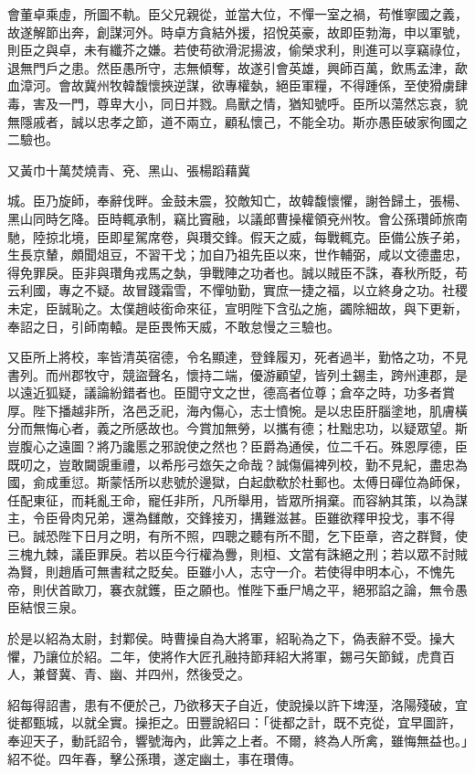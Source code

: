 \begin{pinyinscope}
會董卓乘虛，所圖不軌。臣父兄親從，並當大位，不憚一室之禍，苟惟寧國之義，故遂解節出奔，創謀河外。時卓方貪結外援，招悅英豪，故即臣勃海，申以軍號，則臣之與卓，未有纖芥之嫌。若使苟欲滑泥揚波，偷榮求利，則進可以享竊祿位，退無門戶之患。然臣愚所守，志無傾奪，故遂引會英雄，興師百萬，飲馬孟津，歃血漳河。會故冀州牧韓馥懷挾逆謀，欲專權埶，絕臣軍糧，不得踵係，至使猾虜肆毒，害及一門，尊卑大小，同日并戮。鳥獸之情，猶知號呼。臣所以蕩然忘哀，貌無隱戚者，誠以忠孝之節，道不兩立，顧私懷己，不能全功。斯亦愚臣破家徇國之二驗也。

又黃巾十萬焚燒青、兗、黑山、張楊蹈藉冀

城。臣乃旋師，奉辭伐畔。金鼓未震，狡敵知亡，故韓馥懷懼，謝咎歸土，張楊、黑山同時乞降。臣時輒承制，竊比竇融，以議郎曹操權領兗州牧。會公孫瓚師旅南馳，陸掠北境，臣即星駕席卷，與瓚交鋒。假天之威，每戰輒克。臣備公族子弟，生長京輦，頗聞俎豆，不習干戈；加自乃祖先臣以來，世作輔弼，咸以文德盡忠，得免罪戾。臣非與瓚角戎馬之埶，爭戰陣之功者也。誠以賊臣不誅，春秋所貶，苟云利國，專之不疑。故冒踐霜雪，不憚劬勤，實庶一捷之福，以立終身之功。社稷未定，臣誠恥之。太僕趙岐銜命來征，宣明陛下含弘之施，蠲除細故，與下更新，奉詔之日，引師南轅。是臣畏怖天威，不敢怠慢之三驗也。

又臣所上將校，率皆清英宿德，令名顯達，登鋒履刃，死者過半，勤恪之功，不見書列。而州郡牧守，競盜聲名，懷持二端，優游顧望，皆列土錫圭，跨州連郡，是以遠近狐疑，議論紛錯者也。臣聞守文之世，德高者位尊；倉卒之時，功多者賞厚。陛下播越非所，洛邑乏祀，海內傷心，志士憤惋。是以忠臣肝腦塗地，肌膚橫分而無悔心者，義之所感故也。今賞加無勞，以攜有德；杜黜忠功，以疑眾望。斯豈腹心之遠圖？將乃讒慝之邪說使之然也？臣爵為通侯，位二千石。殊恩厚德，臣既叨之，豈敢闚覬重禮，以希彤弓玈矢之命哉？誠傷偏裨列校，勤不見紀，盡忠為國，侴成重愆。斯蒙恬所以悲號於邊獄，白起歔欷於杜郵也。太傅日磾位為師保，任配東征，而耗亂王命，寵任非所，凡所舉用，皆眾所捐棄。而容納其策，以為謀主，令臣骨肉兄弟，還為讎敵，交鋒接刃，搆難滋甚。臣雖欲釋甲投戈，事不得已。誠恐陛下日月之明，有所不照，四聰之聽有所不聞，乞下臣章，咨之群賢，使三槐九棘，議臣罪戾。若以臣今行權為釁，則桓、文當有誅絕之刑；若以眾不討賊為賢，則趙盾可無書弒之貶矣。臣雖小人，志守一介。若使得申明本心，不愧先帝，則伏首歐刀，褰衣就鑊，臣之願也。惟陛下垂尸鳩之平，絕邪諂之論，無令愚臣結恨三泉。

於是以紹為太尉，封鄴侯。時曹操自為大將軍，紹恥為之下，偽表辭不受。操大懼，乃讓位於紹。二年，使將作大匠孔融持節拜紹大將軍，錫弓矢節鉞，虎賁百人，兼督冀、青、幽、并四州，然後受之。

紹每得詔書，患有不便於己，乃欲移天子自近，使說操以許下埤溼，洛陽殘破，宜徙都甄城，以就全實。操拒之。田豐說紹曰：「徙都之計，既不克從，宜早圖許，奉迎天子，動託詔令，響號海內，此筭之上者。不爾，終為人所禽，雖悔無益也。」紹不從。四年春，擊公孫瓚，遂定幽土，事在瓚傳。


\end{pinyinscope}
